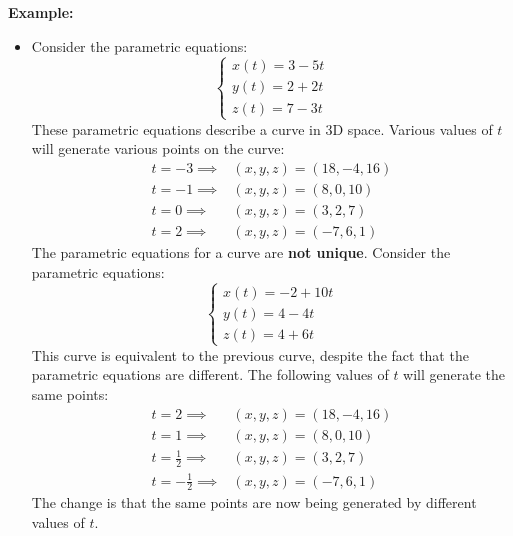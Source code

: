 \documentclass{article}
\begin{document}
\textbf{Example:}

\begin{itemize}
\item Consider the parametric equations:
\[\left\{\begin{array}{l} 
x(t) = 3 - 5t \\ 
y(t) = 2 + 2t \\ 
z(t) = 7 - 3t
\end{array}\right.\]
These parametric equations describe a curve in 3D space. Various values of \(t\) will generate various points on the curve:
\begin{align*}
t = -3 \implies & (x,y,z) = (18, -4, 16) \\
t = -1 \implies & (x,y,z) = (8, 0, 10) \\
t = 0 \implies & (x,y,z) = (3, 2, 7) \\
t = 2 \implies & (x,y,z) = (-7, 6, 1)
\end{align*}
The parametric equations for a curve are {\bf not unique}. Consider the parametric equations:
\[\left\{\begin{array}{l}
x(t) = -2 + 10t \\ 
y(t) = 4 - 4t \\ 
z(t) = 4 + 6t
\end{array}\right.\]
This curve is equivalent to the previous curve, despite the fact that the parametric equations are different. The following values of \(t\) will generate the same points:
\begin{align*}
t = 2 \implies & (x,y,z) = (18, -4, 16) \\
t = 1 \implies & (x,y,z) = (8, 0, 10) \\
t = \frac{1}{2} \implies & (x,y,z) = (3, 2, 7) \\
t = -\frac{1}{2} \implies & (x,y,z) = (-7, 6, 1)
\end{align*}
The change is that the same points are now being generated by different values of \(t\).
\end{itemize}
\end{document}
